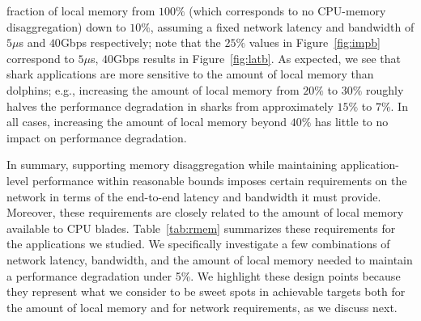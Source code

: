 fraction of local memory from $100\%$ (which corresponds to no CPU-memory disaggregation) down to $10\%$, assuming a fixed network latency and bandwidth of $5\mu$s and $40$Gbps respectively; note that the $25\%$ values in Figure~\ref{fig:impb} correspond to $5\mu$s, $40$Gbps results in Figure~\ref{fig:latb}. 
As expected, we see that shark applications are more sensitive to the amount of local memory than dolphins; e.g., increasing the amount of local memory from $20\%$ to $30\%$ roughly halves the performance degradation in sharks from approximately $15\%$ to $7\%$.
In all cases, increasing the amount of local memory beyond $40\%$ has little to no impact on performance degradation.

In summary, supporting memory disaggregation while maintaining application-level performance within reasonable bounds imposes certain requirements on the network in terms of the end-to-end latency and bandwidth it must provide. Moreover, these requirements are closely related to the amount of local memory available to CPU blades. Table~\ref{tab:rmem} summarizes these requirements for the applications we studied. We specifically investigate a few combinations of network latency, bandwidth, and the amount of local memory needed to maintain a performance degradation under 5\%. 
We highlight these design points because they represent what we consider to be sweet spots in achievable targets both for the amount of local memory and for network requirements, as we discuss next.





